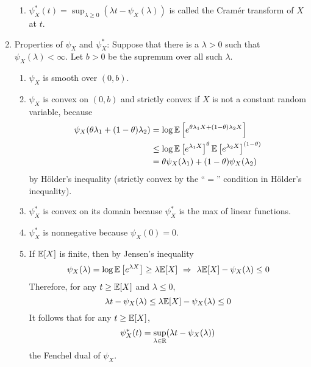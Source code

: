 \begin{enumerate}[label=\arabic{*}.]
\begin{rmk}
\begin{enumerate}[label=(\arabic{*})]
	    	\item $\psi_X^*(t)= \sup_{\lambda \geq 0}(\lambda t - \psi_X(\lambda))$ is called the Cram\'er transform of $X$ at $t$.
	    \end{enumerate}
	\end{rmk}

	\item Properties of $\psi_X$ and $\psi_X^*$: Suppose that there is a $\lambda > 0$ such that $\psi_X(\lambda) < \infty$. Let $b > 0$ be the supremum over all such $\lambda$.
	\begin{enumerate}[label=(\arabic{*})]
		\item $\psi_X$ is smooth over $(0,b)$.
		\item $\psi_X$ is convex on $(0,b)$ and strictly convex if $X$ is not a constant random variable, because
		\begin{equation*}
			\begin{aligned}
				\psi_X(\theta \lambda_1 + (1 - \theta) \lambda_2) & = \log \mathbb{E}\left[e^{\theta \lambda_1X + (1 - \theta) \lambda_2X}\right] \\
				&\leq  \log \mathbb{E}\left[e^{\lambda_1X}\right]^\theta \mathbb{E}\left[e^{\lambda_2X}\right]^{(1 - \theta)} \\
				&= \theta \psi_X(\lambda_1) +(1 - \theta)\psi_X(\lambda_2)
			\end{aligned}
		\end{equation*}
		by H\"older's inequality (strictly convex by the ``$=$'' condition in H\"older's inequality).
		\item $\psi_X^*$ is convex on its domain because $\psi_X^*$ is the max of linear functions.
		\item $\psi_X^*$ is nonnegative because $\psi_X(0) = 0$.
		\item If $\mathbb{E}[X]$ is finite, then by Jensen's inequality
		\begin{equation*}
			\psi_X(\lambda) = \log \mathbb{E}\left[e^{\lambda X}\right] \geq \lambda \mathbb{E}[X] ~\Rightarrow~ \lambda \mathbb{E}[X] - \psi_X(\lambda) \leq 0
		\end{equation*}
		Therefore, for any $t \ge \mathbb{E}[X]$ and $\lambda \leq 0$,
		\begin{equation*}
			\lambda t - \psi_X(\lambda) \leq \lambda \mathbb{E}[X] - \psi_X(\lambda) \leq 0
		\end{equation*}
		It follows that for any $t \ge \mathbb{E}[X]$,
		\begin{equation*}
			\psi_X^*(t) = \sup_{\lambda \in \mathbb{R}} (\lambda t - \psi_X(\lambda))
		\end{equation*}
		the Fenchel dual of $\psi_X$.
	\end{enumerate}

\end{enumerate}
